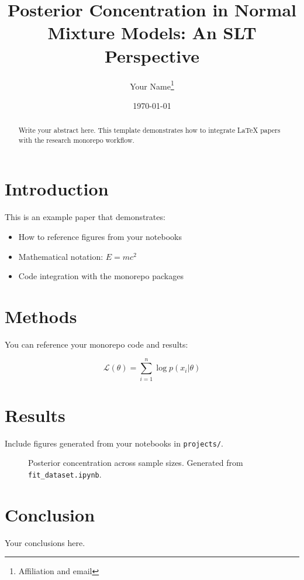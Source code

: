 \documentclass[11pt]{article}
\title{Posterior Concentration in Normal Mixture Models: An SLT Perspective}
\author{Your Name\footnote{Affiliation and email}}
\date{\today}
\begin{document}
\maketitle

\begin{abstract}
Write your abstract here. This template demonstrates how to integrate LaTeX papers with the research monorepo workflow.
\end{abstract}

\section{Introduction}

This is an example paper that demonstrates:
\begin{itemize}
\item How to reference figures from your notebooks
\item Mathematical notation: $E = mc^2$
\item Code integration with the monorepo packages
\end{itemize}

\section{Methods}

You can reference your monorepo code and results:

\begin{equation}
\mathcal{L}(\theta) = \sum_{i=1}^{n} \log p(x_i | \theta)
\end{equation}

\section{Results}

Include figures generated from your notebooks in \texttt{projects/}.

\begin{figure}[h]
\centering
\caption{Posterior concentration across sample sizes. Generated from \texttt{fit\_dataset.ipynb}.}
\label{fig:posterior}
\end{figure}

\section{Conclusion}

Your conclusions here.



\end{document}
